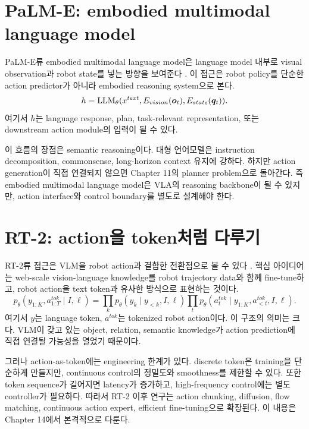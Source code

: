 \section{PaLM-E: embodied multimodal language model}

PaLM-E류 embodied multimodal language model은 language model 내부로 visual observation과 robot state를 넣는 방향을 보여준다 \cite{palme2023}. 이 접근은 robot policy를 단순한 action predictor가 아니라 embodied reasoning system으로 본다.
\begin{equation}
  h
  =
  \mathrm{LLM}_{\theta}
  (
  x^{text},
  E_{vision}(\bm{o}_t),
  E_{state}(\bm{q}_t)
  ).
  \label{eq:palm-e-embedding}
\end{equation}
여기서 $h$는 language response, plan, task-relevant representation, 또는 downstream action module의 입력이 될 수 있다.

이 흐름의 장점은 semantic reasoning이다. 대형 언어모델은 instruction decomposition, commonsense, long-horizon context 유지에 강하다. 하지만 action generation이 직접 연결되지 않으면 Chapter 11의 planner problem으로 돌아간다. 즉 embodied multimodal language model은 VLA의 reasoning backbone이 될 수 있지만, action interface와 control boundary를 별도로 설계해야 한다.

\section{RT-2: action을 token처럼 다루기}

RT-2류 접근은 VLM을 robot action과 결합한 전환점으로 볼 수 있다 \cite{rt22023}. 핵심 아이디어는 web-scale vision-language knowledge를 robot trajectory data와 함께 fine-tune하고, robot action을 text token과 유사한 방식으로 표현하는 것이다.
\begin{equation}
  p_{\theta}
  (y_{1:K}, a_{1:T}^{tok}
  \mid
  I,\ell)
  =
  \prod_k p_{\theta}(y_k \mid y_{<k},I,\ell)
  \prod_t p_{\theta}(a_t^{tok}\mid y_{1:K},a_{<t}^{tok},I,\ell).
  \label{eq:rt2-action-token}
\end{equation}
여기서 $y$는 language token, $a^{tok}$는 tokenized robot action이다. 이 구조의 의미는 크다. VLM이 갖고 있는 object, relation, semantic knowledge가 action prediction에 직접 연결될 가능성을 열었기 때문이다.

그러나 action-as-token에는 engineering 한계가 있다. discrete token은 training을 단순하게 만들지만, continuous control의 정밀도와 smoothness를 제한할 수 있다. 또한 token sequence가 길어지면 latency가 증가하고, high-frequency control에는 별도 controller가 필요하다. 따라서 RT-2 이후 연구는 action chunking, diffusion, flow matching, continuous action expert, efficient fine-tuning으로 확장된다. 이 내용은 Chapter 14에서 본격적으로 다룬다.

